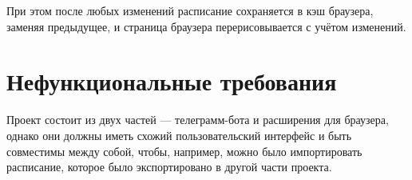 			При этом после любых изменений расписание сохраняется в кэш браузера, заменяя предыдущее, и страница браузера перерисовывается с учётом изменений.
	\section{Нефункциональные требования}
		Проект состоит из двух частей --- телеграмм-бота и расширения для браузера, однако они должны иметь схожий пользовательский интерфейс и быть совместимы между собой, чтобы, например, можно было импортировать расписание, которое было экспортировано в другой части проекта.
